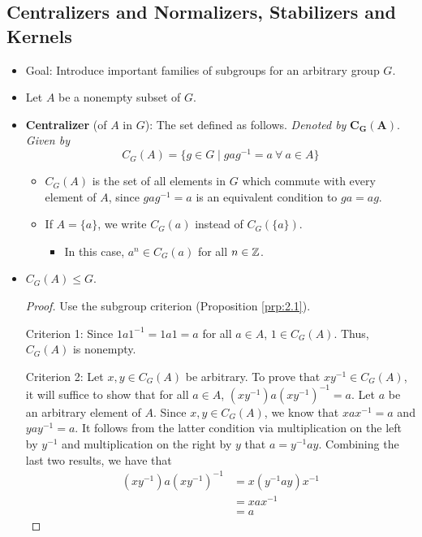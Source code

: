 \documentclass[../notes.tex]{subfiles}
\begin{document}
\subsection*{Centralizers and Normalizers, Stabilizers and Kernels}
\begin{itemize}
    \item Goal: Introduce important families of subgroups for an arbitrary group $G$.
    \item Let $A$ be a nonempty subset of $G$.
    \item \textbf{Centralizer} (of $A$ in $G$): The set defined as follows. \emph{Denoted by} $\bm{C_G(A)}$. \emph{Given by}
    \begin{equation*}
        C_G(A) = \{g\in G\mid gag^{-1}=a\ \forall\ a\in A\}
    \end{equation*}
    \begin{itemize}
        \item $C_G(A)$ is the set of all elements in $G$ which commute with every element of $A$, since $gag^{-1}=a$ is an equivalent condition to $ga=ag$.
        \item If $A=\{a\}$, we write $C_G(a)$ instead of $C_G(\{a\})$.
        \begin{itemize}
            \item In this case, $a^n\in C_G(a)$ for all $n\in\mathbb{Z}$.
        \end{itemize}
    \end{itemize}
    \item $C_G(A)\leq G$.
    \begin{proof}
        Use the subgroup criterion (Proposition \ref{prp:2.1}).\par
        Criterion 1: Since $1a1^{-1}=1a1=a$ for all $a\in A$, $1\in C_G(A)$. Thus, $C_G(A)$ is nonempty.\par
        Criterion 2: Let $x,y\in C_G(A)$ be arbitrary. To prove that $xy^{-1}\in C_G(A)$, it will suffice to show that for all $a\in A$, $(xy^{-1})a(xy^{-1})^{-1}=a$. Let $a$ be an arbitrary element of $A$. Since $x,y\in C_G(A)$, we know that $xax^{-1}=a$ and $yay^{-1}=a$. It follows from the latter condition via multiplication on the left by $y^{-1}$ and multiplication on the right by $y$ that $a=y^{-1}ay$. Combining the last two results, we have that
        \begin{align*}
            (xy^{-1})a(xy^{-1})^{-1} &= x(y^{-1}ay)x^{-1}\\
            &= xax^{-1}\\
            &= a
        \end{align*}

\end{proof}
\end{itemize}
\end{document}
